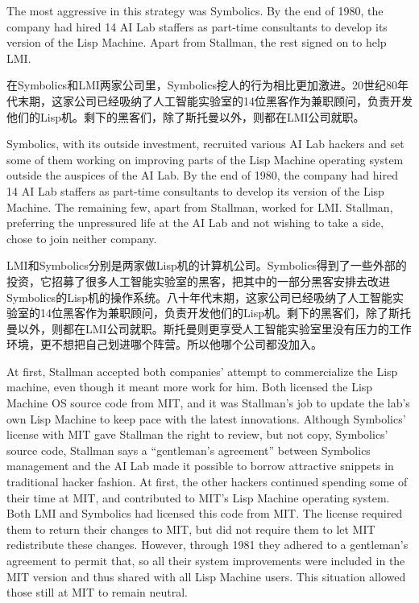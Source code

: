 \ifdefined\eng
The most aggressive in this strategy was Symbolics. By the end of 1980, the company had hired 14 AI Lab staffers as part-time consultants to develop its version of the Lisp Machine. Apart from Stallman, the rest signed on to help LMI.
\fi

\ifdefined\chs
在Symbolics和LMI两家公司里，Symbolics挖人的行为相比更加激进。20世纪80年代末期，这家公司已经吸纳了人工智能实验室的14位黑客作为兼职顾问，负责开发他们的Lisp机。剩下的黑客们，除了斯托曼以外，则都在LMI公司就职。
\fi
\fi

\ifdefined\vtwo
\ifdefined\eng
Symbolics, with its outside investment, recruited various AI Lab hackers and set some of them working on improving parts of the Lisp Machine operating system outside the auspices of the AI Lab. By the end of 1980, the company had hired 14 AI Lab staffers as part-time consultants to develop its version of the Lisp Machine. The remaining few, apart from Stallman, worked for LMI.  Stallman, preferring the unpressured life at the AI Lab and not wishing to take a side, chose to join neither company.
\fi

\ifdefined\chs
LMI和Symbolics分别是两家做Lisp机的计算机公司。Symbolics得到了一些外部的投资，它招募了很多人工智能实验室的黑客，把其中的一部分黑客安排去改进Symbolics的Lisp机的操作系统。八十年代末期，这家公司已经吸纳了人工智能实验室的14位黑客作为兼职顾问，负责开发他们的Lisp机。剩下的黑客们，除了斯托曼以外，则都在LMI公司就职。斯托曼则更享受人工智能实验室里没有压力的工作环境，更不想把自己划进哪个阵营。所以他哪个公司都没加入。
\fi
\fi

\ifdefined\eng
\ifdefined\vone
At first, Stallman accepted both companies' attempt to commercialize the Lisp machine, even though it meant more work for him. Both licensed the Lisp Machine OS source code from MIT, and it was Stallman's job to update the lab's own Lisp Machine to keep pace with the latest innovations. Although Symbolics' license with MIT gave Stallman the right to review, but not copy, Symbolics' source code, Stallman says a ``gentleman's agreement'' between Symbolics management and the AI Lab made it possible to borrow attractive snippets in traditional hacker fashion.
\fi
\ifdefined\vtwo
At first, the other hackers continued spending some of their time at MIT, and contributed to MIT's Lisp Machine operating system. Both LMI and Symbolics had licensed this code from MIT. The license required them to return their changes to MIT, but did not require them to let MIT redistribute these changes.  However, through 1981 they adhered to a gentleman's agreement to permit that, so all their system improvements were included in the MIT version and thus shared with all Lisp Machine users. This situation allowed those still at MIT to remain neutral.
\fi
\fi

